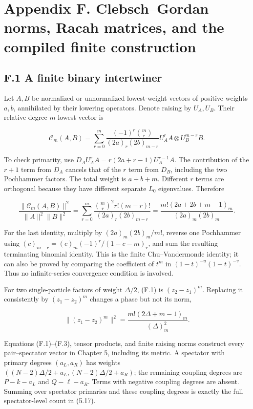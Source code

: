 \documentclass[a4paper,11pt]{article}
\numberwithin{equation}{section}
\begin{document}
\clearpage
\hypertarget{appendix-f.-clebschgordan-norms-racah-matrices-and-the-compiled-finite-construction}{%
\section{Appendix F. Clebsch--Gordan norms, Racah matrices, and the compiled finite construction}\label{appendix-f.-clebschgordan-norms-racah-matrices-and-the-compiled-finite-construction}}

\hypertarget{f.1-a-finite-binary-intertwiner}{%
\subsection{F.1 A finite binary intertwiner}\label{f.1-a-finite-binary-intertwiner}}

Let \(A,B\) be normalized or unnormalized lowest-weight vectors of positive weights \(a,b\), annihilated by their lowering operators. Denote raising by \(U_A,U_B\). Their relative-degree-\(m\) lowest vector is

\[
\mathcal C_m(A,B)=\sum_{r=0}^m
\frac{(-1)^r\binom mr}{(2a)_r(2b)_{m-r}}
U_A^rA\otimes U_B^{m-r}B.
\tag{F.1}
\]

To check primarity, use \(D_AU_A^rA=r(2a+r-1)U_A^{r-1}A\). The contribution of the \(r+1\) term from \(D_A\) cancels that of the \(r\) term from \(D_B\), including the two Pochhammer factors. The total weight is \(a+b+m\). Different \(r\) terms are orthogonal because they have different separate \(L_0\) eigenvalues. Therefore

\[
\frac{\|\mathcal C_m(A,B)\|^2}{\|A\|^2\|B\|^2}
=\sum_{r=0}^m\frac{\binom mr^2r!(m-r)!}{(2a)_r(2b)_{m-r}}
=\frac{m!(2a+2b+m-1)_m}{(2a)_m(2b)_m}.
\tag{F.2}
\]

For the last identity, multiply by \((2a)_m(2b)_m/m!\), reverse one Pochhammer using \((c)_{m-r}=(c)_m(-1)^r/(1-c-m)_r\), and sum the resulting terminating binomial identity. This is the finite Chu--Vandermonde identity; it can also be proved by comparing the coefficient of \(t^m\) in \((1-t)^{-u}(1-t)^{-v}\). Thus no infinite-series convergence condition is involved.

For two single-particle factors of weight \(\Delta/2\), (F.1) is \((z_2-z_1)^m\). Replacing it consistently by \((z_1-z_2)^m\) changes a phase but not its norm,

\[
\|(z_1-z_2)^m\|^2=\frac{m!(2\Delta+m-1)_m}{(\Delta)_m^2}.
\tag{F.3}
\]

Equations (F.1)--(F.3), tensor products, and finite raising norms construct every pair--spectator vector in Chapter 5, including its metric. A spectator with primary degrees \((a_L,a_R)\) has weights \(((N-2)\Delta/2+a_L,(N-2)\Delta/2+a_R)\); the remaining coupling degrees are \(P-k-a_L\) and \(Q-\ell-a_R\). Terms with negative coupling degrees are absent. Summing over spectator primaries and these coupling degrees is exactly the full spectator-level count in (5.17).
\end{document}
